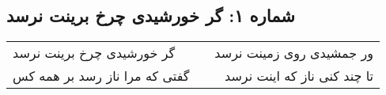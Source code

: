 \begin{center}
\section*{شماره ۱: گر خورشیدی چرخ برینت نرسد}
\label{sec:001}
\begin{longtable}{l p{0.5cm} r}
گر خورشیدی چرخ برینت نرسد
&&
ور جمشیدی روی زمینت نرسد
\\
گفتی که مرا ناز رسد بر همه کس
&&
تا چند کنی ناز که اینت نرسد
\\
\end{longtable}
\end{center}
